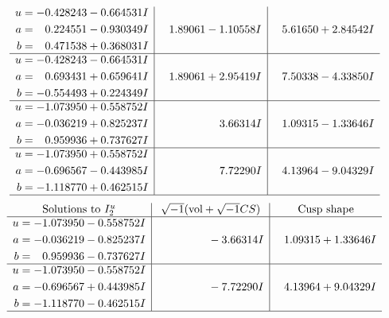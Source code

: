 \documentclass[1p]{elsarticle_modified}
\theoremstyle{definition}
\newcommand{\I}{\sqrt{-1}}
\begin{document}
$$\begin{array}{c|c|c}
\begin{aligned}
u &= -0.428243 - 0.664531 I \\
a &= \phantom{-}0.224551 - 0.930349 I \\
b &= \phantom{-}0.471538 + 0.368031 I\end{aligned}
 & \phantom{-}1.89061 - 1.10558 I & \phantom{-}5.61650 + 2.84542 I \\ \hline\begin{aligned}
u &= -0.428243 - 0.664531 I \\
a &= \phantom{-}0.693431 + 0.659641 I \\
b &= -0.554493 + 0.224349 I\end{aligned}
 & \phantom{-}1.89061 + 2.95419 I & \phantom{-}7.50338 - 4.33850 I \\ \hline\begin{aligned}
u &= -1.073950 + 0.558752 I \\
a &= -0.036219 + 0.825237 I \\
b &= \phantom{-}0.959936 + 0.737627 I\end{aligned}
 & \phantom{-0.000000 -}3.66314 I & \phantom{-}1.09315 - 1.33646 I \\ \hline\begin{aligned}
u &= -1.073950 + 0.558752 I \\
a &= -0.696567 - 0.443985 I \\
b &= -1.118770 + 0.462515 I\end{aligned}
 & \phantom{-0.000000 -}7.72290 I & \phantom{-}4.13964 - 9.04329 I\\
 \hline 
 \end{array}$$\newpage$$\begin{array}{c|c|c}  
\text{Solutions to }I^u_{2}& \I (\text{vol} + \sqrt{-1}CS) & \text{Cusp shape}\\
 \hline 
\begin{aligned}
u &= -1.073950 - 0.558752 I \\
a &= -0.036219 - 0.825237 I \\
b &= \phantom{-}0.959936 - 0.737627 I\end{aligned}
 & \phantom{-0.000000 } -3.66314 I & \phantom{-}1.09315 + 1.33646 I \\ \hline\begin{aligned}
u &= -1.073950 - 0.558752 I \\
a &= -0.696567 + 0.443985 I \\
b &= -1.118770 - 0.462515 I\end{aligned}
 & \phantom{-0.000000 } -7.72290 I & \phantom{-}4.13964 + 9.04329 I\\
 \hline 
 \end{array}$$\newpage
\end{document}
